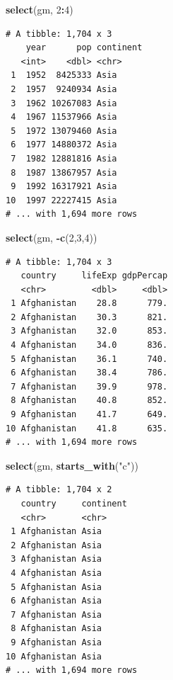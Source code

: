 \documentclass[
]{krantz}
\makeatletter
\newenvironment{Shaded}{\begin{snugshade}}{\end{snugshade}}
\newcommand{\DecValTok}[1]{\textcolor[rgb]{0.06,0.06,0.06}{#1}}
\newcommand{\KeywordTok}[1]{\textcolor[rgb]{0.27,0.27,0.27}{\textbf{#1}}}
\newcommand{\NormalTok}[1]{#1}
\newcommand{\OperatorTok}[1]{\textcolor[rgb]{0.43,0.43,0.43}{\textbf{#1}}}
\newcommand{\StringTok}[1]{\textcolor[rgb]{0.5,0.5,0.5}{#1}}
\newenvironment{kframe}{%
\medskip{}
\setlength{\fboxsep}{.8em}
 \def\at@end@of@kframe{}%
 \ifinner\ifhmode%
  \def\at@end@of@kframe{\end{minipage}}%
  \begin{minipage}{\columnwidth}%
 \fi\fi%
 \def\FrameCommand##1{\hskip\@totalleftmargin \hskip-\fboxsep
 \colorbox{shadecolor}{##1}\hskip-\fboxsep
     \hskip-\linewidth \hskip-\@totalleftmargin \hskip\columnwidth}%
 \MakeFramed {\advance\hsize-\width
   \@totalleftmargin\z@ \linewidth\hsize
   \@setminipage}}%
 {\par\unskip\endMakeFramed%
 \at@end@of@kframe}
\renewenvironment{Shaded}{\begin{kframe}}{\end{kframe}}
\makeatother
\begin{document}
\begin{Shaded}
\begin{Highlighting}[]
\KeywordTok{select}\NormalTok{(gm, }\DecValTok{2}\OperatorTok{:}\DecValTok{4}\NormalTok{)}
\end{Highlighting}
\end{Shaded}

\begin{verbatim}
# A tibble: 1,704 x 3
    year      pop continent
   <int>    <dbl> <chr>    
 1  1952  8425333 Asia     
 2  1957  9240934 Asia     
 3  1962 10267083 Asia     
 4  1967 11537966 Asia     
 5  1972 13079460 Asia     
 6  1977 14880372 Asia     
 7  1982 12881816 Asia     
 8  1987 13867957 Asia     
 9  1992 16317921 Asia     
10  1997 22227415 Asia     
# ... with 1,694 more rows
\end{verbatim}

\begin{Shaded}
\begin{Highlighting}[]
\KeywordTok{select}\NormalTok{(gm, }\OperatorTok{{-}}\KeywordTok{c}\NormalTok{(}\DecValTok{2}\NormalTok{,}\DecValTok{3}\NormalTok{,}\DecValTok{4}\NormalTok{))}
\end{Highlighting}
\end{Shaded}

\begin{verbatim}
# A tibble: 1,704 x 3
   country     lifeExp gdpPercap
   <chr>         <dbl>     <dbl>
 1 Afghanistan    28.8      779.
 2 Afghanistan    30.3      821.
 3 Afghanistan    32.0      853.
 4 Afghanistan    34.0      836.
 5 Afghanistan    36.1      740.
 6 Afghanistan    38.4      786.
 7 Afghanistan    39.9      978.
 8 Afghanistan    40.8      852.
 9 Afghanistan    41.7      649.
10 Afghanistan    41.8      635.
# ... with 1,694 more rows
\end{verbatim}

\begin{Shaded}
\begin{Highlighting}[]
\KeywordTok{select}\NormalTok{(gm, }\KeywordTok{starts\_with}\NormalTok{(}\StringTok{"c"}\NormalTok{))}
\end{Highlighting}
\end{Shaded}

\begin{verbatim}
# A tibble: 1,704 x 2
   country     continent
   <chr>       <chr>    
 1 Afghanistan Asia     
 2 Afghanistan Asia     
 3 Afghanistan Asia     
 4 Afghanistan Asia     
 5 Afghanistan Asia     
 6 Afghanistan Asia     
 7 Afghanistan Asia     
 8 Afghanistan Asia     
 9 Afghanistan Asia     
10 Afghanistan Asia     
# ... with 1,694 more rows
\end{verbatim}
\end{document}
